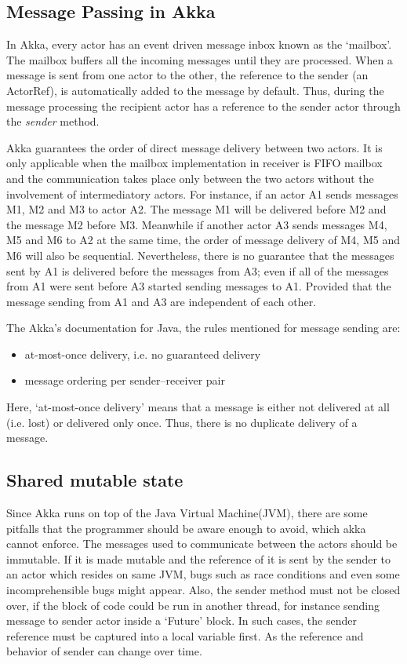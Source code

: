   \subsection{Message Passing in Akka}
  In Akka, every actor has an event driven message inbox known as the ‘mailbox’. The mailbox buffers all the incoming messages until they are processed. When a message is sent from one actor to the other, the reference to the sender (an ActorRef), is automatically added to the message by default. Thus, during the message processing the recipient actor has a reference to the sender actor through the \emph{sender} method.~\cite{akkaJavaDoc}

  Akka guarantees the order of direct message delivery between two actors. It is only applicable when the mailbox implementation in receiver is FIFO mailbox and the communication takes place only between the two actors without the involvement of intermediatory actors. For instance, if an actor A1 sends messages M1, M2 and M3 to actor A2. The message M1 will be delivered before M2 and the message M2 before M3. Meanwhile if another actor A3 sends messages M4, M5 and M6 to A2 at the same time, the order of message delivery of M4, M5 and M6 will also be sequential. Nevertheless, there is no guarantee that the messages sent by A1 is delivered before the messages from A3; even if all of the messages from A1 were sent before A3 started sending messages to A1. Provided that the message sending from A1 and A3 are independent of each other. ~\cite{akkaJavaDoc}

  The Akka's documentation for Java, the rules mentioned for message sending are: \cite{akkaJavaDoc}
  \begin{itemize}
    \item at-most-once delivery, i.e. no guaranteed delivery
    \item message ordering per sender–receiver pair
  \end{itemize}

Here, ‘at-most-once delivery’ means that a message is either not delivered at all (i.e. lost) or delivered only once. Thus, there is no duplicate delivery of a message.

  \subsection{Shared mutable state}
  Since Akka runs on top of the Java Virtual Machine(JVM), there are some pitfalls that the programmer should be aware enough to avoid, which akka cannot enforce. The messages used to communicate between the actors should be immutable. If it is made mutable and the reference of it is sent by the sender to an actor which resides on same JVM, bugs such as race conditions and even some incomprehensible bugs might appear. Also, the sender method must not be closed over, if the block of code could be run in another thread, for instance sending message to sender actor inside a ‘Future’ block. In such cases, the sender reference must be captured into a local variable first. As the reference and behavior of sender can change over time.~\cite{akkaJavaDoc}

